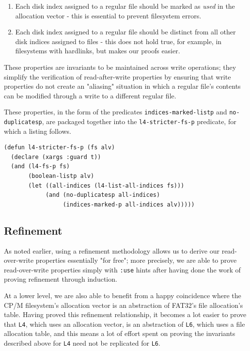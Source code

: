 \documentclass[runningheads,a4paper]{llncs}
\begin{document}
\begin{enumerate}
\item Each disk index assigned to a regular file should be
  marked as \textit{used} in the allocation vector - this is essential
  to prevent filesystem errors.
\item Each disk index assigned to a regular file should be distinct
  from all other disk indices assigned to files - this does not hold
  true, for example, in filesystems with hardlinks, but makes our
  proofs easier.
\end{enumerate}

These properties are invariants to be maintained across
write operations; they simplify the verification of read-after-write
properties by ensuring that write properties do not create an
"aliasing" situation in which a regular file's contents can be
modified through a write to a different regular file.

These properties, in the form of the predicates
\texttt{indices-marked-listp} and \texttt{no-duplicatesp}, are
packaged together into the \texttt{l4-stricter-fs-p} predicate, for
which a listing follows.

\medskip

\noindent
\begin{verbatim}
(defun l4-stricter-fs-p (fs alv)
  (declare (xargs :guard t))
  (and (l4-fs-p fs)
       (boolean-listp alv)
       (let ((all-indices (l4-list-all-indices fs)))
            (and (no-duplicatesp all-indices)
                 (indices-marked-p all-indices alv)))))
\end{verbatim}

\subsection{Refinement}

As noted earlier, using a refinement methodology allows us to derive
our read-over-write properties essentially "for free"; more precisely,
we are able to prove read-over-write properties simply with
\texttt{:use} hints after having done the work of proving refinement
through induction.

At a lower level, we are also able to benefit from a happy coincidence
where the CP/M filesystem's allocation vector is an abstraction of
FAT32's file allocation's table. Having proved this refinement
relationship, it becomes a lot easier to prove that \texttt{L4}, which
uses an allocation vector, is an abstraction of \texttt{L6}, which
uses a file allocation table, and this means a lot of effort spent on
proving the invariants described above for \texttt{L4} need not be
replicated for \texttt{L6}.
\end{document}
